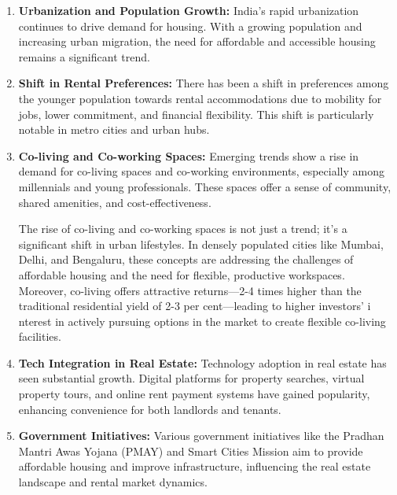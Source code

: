 \begin{enumerate}
      \item \textbf{Urbanization and Population Growth:} India's rapid urbanization
            continues to drive demand for housing. With a growing population
            and increasing urban migration, the need for affordable and
            accessible housing remains a significant trend.~\cite{urbanization-and-its-impact-on-housing}
      \item \textbf{Shift in Rental Preferences:} There has been a shift in preferences
            among the younger population towards rental accommodations
            due to mobility for jobs, lower commitment, and financial
            flexibility. This shift is particularly notable in metro cities
            and urban hubs.
      \item \textbf{Co-living and Co-working Spaces:} Emerging trends show a rise in
            demand for co-living spaces and co-working environments, especially
            among millennials and young professionals. These spaces offer a sense of
            community, shared amenities, and cost-effectiveness.\par
            The rise of co-living and co-working spaces is not just a trend; it's a
            significant shift in urban lifestyles. In densely populated cities like
            Mumbai, Delhi, and Bengaluru, these concepts are addressing the challenges
            of affordable housing and the need for flexible, productive workspaces.
            Moreover, co-living offers attractive returns—2-4 times higher than the
            traditional residential yield of 2-3 per cent—leading to higher investors’ i
            nterest in actively pursuing options in the market to create flexible
            co-living facilities.~\cite{investors-on-coliving}
      \item \textbf{Tech Integration in Real Estate:} Technology adoption in real estate
            has seen substantial growth. Digital platforms for property searches,
            virtual property tours, and online rent payment systems have gained
            popularity, enhancing convenience for both landlords and tenants.
      \item \textbf{Government Initiatives:} Various government initiatives like the
            Pradhan Mantri Awas Yojana (PMAY) and Smart Cities Mission aim to
            provide affordable housing and improve infrastructure, influencing the
            real estate landscape and rental market dynamics.
\end{enumerate}

